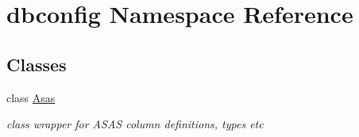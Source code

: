 \hypertarget{namespacedbconfig}{
\section{dbconfig Namespace Reference}
\label{namespacedbconfig}
}
\subsection*{Classes}
\begin{DoxyCompactItemize}
\item 
class \hyperlink{classdbconfig_1_1Asas}{Asas}
\begin{DoxyCompactList}\small\item\em class wrapper for ASAS column definitions, types etc \item\end{DoxyCompactList}\end{DoxyCompactItemize}
